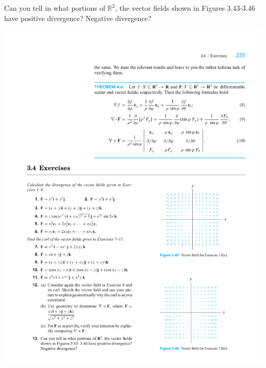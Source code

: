 \documentclass[boxes]{gsypset}
\begin{document}
\begin{problem}[3.4.13]
	Can you tell in what portions of $\mathbb{R}^2$, the vector fields shown
	in Figures 3.43-3.46 have positive divergence? Negative
	divergence?
	\begin{center}
		\includegraphics{img/3_4_13a}\qquad

\end{center}
\end{problem}
\end{document}
